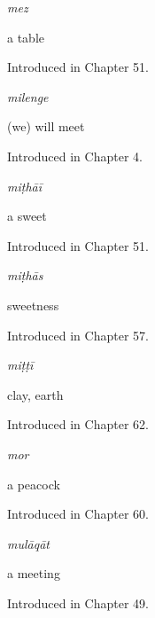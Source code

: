 \noindent\begin{minipage}[t]{\linewidth}
\raggedright
\textbf{}\enspace\emph{mez}\par
\small a table\par
\footnotesize Introduced in Chapter 51.
\end{minipage}\par\medskip

\noindent\begin{minipage}[t]{\linewidth}
\raggedright
\textbf{}\enspace\emph{milenge}\par
\small (we) will meet\par
\footnotesize Introduced in Chapter 4.
\end{minipage}\par\medskip

\noindent\begin{minipage}[t]{\linewidth}
\raggedright
\textbf{}\enspace\emph{miṭhāī}\par
\small a sweet\par
\footnotesize Introduced in Chapter 51.
\end{minipage}\par\medskip

\noindent\begin{minipage}[t]{\linewidth}
\raggedright
\textbf{}\enspace\emph{miṭhās}\par
\small sweetness\par
\footnotesize Introduced in Chapter 57.
\end{minipage}\par\medskip

\noindent\begin{minipage}[t]{\linewidth}
\raggedright
\textbf{}\enspace\emph{miṭṭī}\par
\small clay, earth\par
\footnotesize Introduced in Chapter 62.
\end{minipage}\par\medskip

\noindent\begin{minipage}[t]{\linewidth}
\raggedright
\textbf{}\enspace\emph{mor}\par
\small a peacock\par
\footnotesize Introduced in Chapter 60.
\end{minipage}\par\medskip

\noindent\begin{minipage}[t]{\linewidth}
\raggedright
\textbf{}\enspace\emph{mulāqāt}\par
\small a meeting\par
\footnotesize Introduced in Chapter 49.
\end{minipage}\par\medskip

